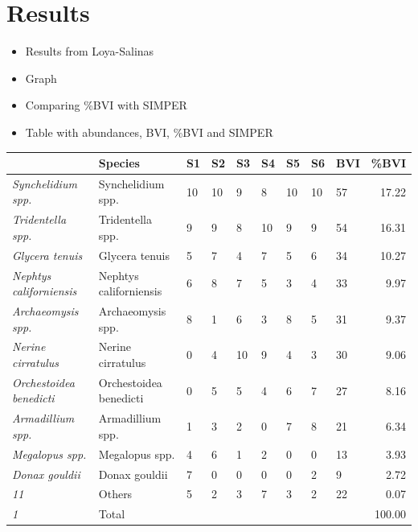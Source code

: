 \documentclass[
]{article}
\providecommand{\tightlist}{%
  \setlength{\itemsep}{0pt}\setlength{\parskip}{0pt}}
\begin{document}
\hypertarget{results}{%
\section{Results}\label{results}}

\begin{itemize}
\tightlist
\item
  Results from Loya-Salinas
\item
  Graph
\item
  Comparing \%BVI with SIMPER
\item
  Table with abundances, BVI, \%BVI and SIMPER
\end{itemize}

\begin{tabular}{>{}lllllllllr}
\toprule
  & Species & S1 & S2 & S3 & S4 & S5 & S6 & BVI & \%BVI\\
\midrule
\em{Synchelidium spp.} & Synchelidium spp. & 10 & 10 & 9 & 8 & 10 & 10 & 57 & 17.22\\
\em{Tridentella spp.} & Tridentella spp. & 9 & 9 & 8 & 10 & 9 & 9 & 54 & 16.31\\
\em{Glycera tenuis} & Glycera tenuis & 5 & 7 & 4 & 7 & 5 & 6 & 34 & 10.27\\
\em{Nephtys californiensis} & Nephtys californiensis & 6 & 8 & 7 & 5 & 3 & 4 & 33 & 9.97\\
\em{Archaeomysis spp.} & Archaeomysis spp. & 8 & 1 & 6 & 3 & 8 & 5 & 31 & 9.37\\
\addlinespace
\em{Nerine cirratulus} & Nerine cirratulus & 0 & 4 & 10 & 9 & 4 & 3 & 30 & 9.06\\
\em{Orchestoidea benedicti} & Orchestoidea benedicti & 0 & 5 & 5 & 4 & 6 & 7 & 27 & 8.16\\
\em{Armadillium spp.} & Armadillium spp. & 1 & 3 & 2 & 0 & 7 & 8 & 21 & 6.34\\
\em{Megalopus spp.} & Megalopus spp. & 4 & 6 & 1 & 2 & 0 & 0 & 13 & 3.93\\
\em{Donax gouldii} & Donax gouldii & 7 & 0 & 0 & 0 & 0 & 2 & 9 & 2.72\\
\addlinespace
\em{11} & Others & 5 & 2 & 3 & 7 & 3 & 2 & 22 & 0.07\\
\em{1} & Total &  &  &  &  &  &  &  & 100.00\\
\bottomrule
\end{tabular}
\end{document}
